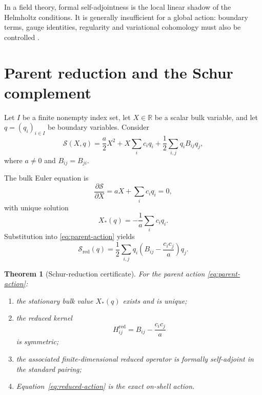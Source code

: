 \documentclass[11pt,a4paper]{article}
\newtheorem{theorem}{Theorem}[section]
\theoremstyle{definition}
\theoremstyle{remark}
\newcommand{\R}{\mathbb{R}}
\newcommand{\Sact}{\mathcal{S}}
\begin{document}
In a field theory, formal self-adjointness is the local linear shadow of the
Helmholtz conditions. It is generally insufficient for a global action:
boundary terms, gauge identities, regularity and variational cohomology must
also be controlled \cite{Anderson1992,Olver1993}.

\section{Parent reduction and the Schur complement}
\label{sec:schur}

Let $I$ be a finite nonempty index set, let $X\in\R$ be a scalar bulk
variable, and let $q=(q_i)_{i\in I}$ be boundary variables. Consider
\begin{equation}
  \Sact(X,q)
  =\frac{a}{2}X^2+X\sum_i c_iq_i
   +\frac12\sum_{i,j}q_iB_{ij}q_j,
  \label{eq:parent-action}
\end{equation}
where $a\ne0$ and $B_{ij}=B_{ji}$.

The bulk Euler equation is
\begin{equation}
  \frac{\partial\Sact}{\partial X}=aX+\sum_i c_iq_i=0,
\end{equation}
with unique solution
\begin{equation}
  X_*(q)=-\frac{1}{a}\sum_i c_iq_i.
\end{equation}
Substitution into \eqref{eq:parent-action} yields
\begin{equation}
  \Sact_{\mathrm{red}}(q)
  =\frac12\sum_{i,j}q_i
  \left(B_{ij}-\frac{c_ic_j}{a}\right)q_j.
  \label{eq:reduced-action}
\end{equation}

\begin{theorem}[Schur-reduction certificate]
For the parent action \eqref{eq:parent-action}:
\begin{enumerate}
  \item the stationary bulk value $X_*(q)$ exists and is unique;
  \item the reduced kernel
  \begin{equation}
    H^{\mathrm{red}}_{ij}=B_{ij}-\frac{c_ic_j}{a}
  \end{equation}
  is symmetric;
  \item the associated finite-dimensional reduced operator is formally
        self-adjoint in the standard pairing;
  \item Equation~\eqref{eq:reduced-action} is the exact on-shell action.
\end{enumerate}
\end{theorem}
\end{document}
